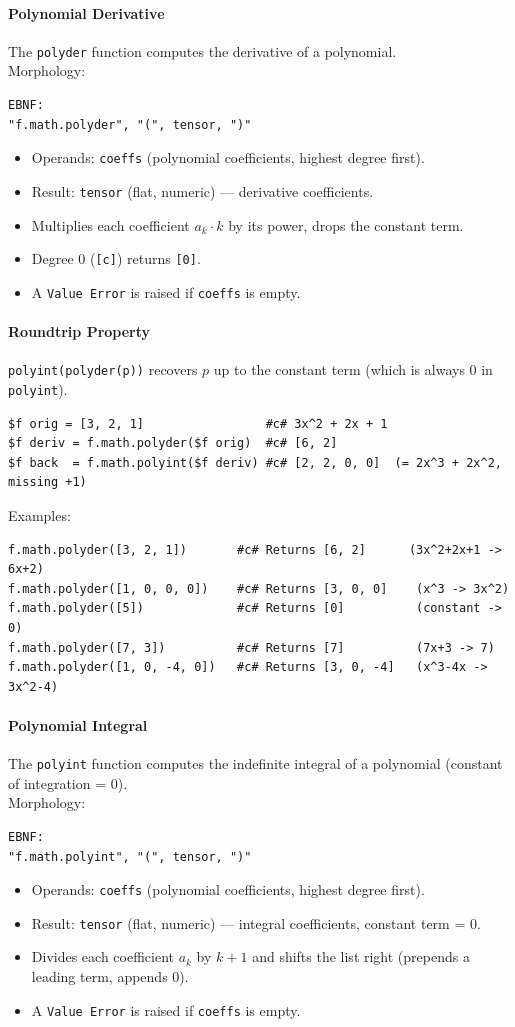 \paragraph{Polynomial Derivative}
The \texttt{polyder} function computes the derivative of a polynomial. \\ Morphology:
\begin{verbatim}
EBNF:
"f.math.polyder", "(", tensor, ")"
\end{verbatim}
\begin{itemize}
\item Operands: \texttt{coeffs} (polynomial coefficients, highest degree first).
\item Result: \texttt{tensor} (flat, numeric) --- derivative coefficients.
\item Multiplies each coefficient $a_k \cdot k$ by its power, drops the constant term.
\item Degree 0 (\texttt{[c]}) returns \texttt{[0]}.
\item A \texttt{Value Error} is raised if \texttt{coeffs} is empty.
\end{itemize}
\paragraph{Roundtrip Property} \texttt{polyint(polyder(p))} recovers $p$ up to the constant term (which is always 0 in \texttt{polyint}).
\begin{verbatim}
$f orig = [3, 2, 1]                 #c# 3x^2 + 2x + 1
$f deriv = f.math.polyder($f orig)  #c# [6, 2]
$f back  = f.math.polyint($f deriv) #c# [2, 2, 0, 0]  (= 2x^3 + 2x^2, missing +1)
\end{verbatim}
Examples:
\begin{verbatim}
f.math.polyder([3, 2, 1])       #c# Returns [6, 2]      (3x^2+2x+1 -> 6x+2)
f.math.polyder([1, 0, 0, 0])    #c# Returns [3, 0, 0]    (x^3 -> 3x^2)
f.math.polyder([5])             #c# Returns [0]          (constant -> 0)
f.math.polyder([7, 3])          #c# Returns [7]          (7x+3 -> 7)
f.math.polyder([1, 0, -4, 0])   #c# Returns [3, 0, -4]   (x^3-4x -> 3x^2-4)
\end{verbatim}

\paragraph{Polynomial Integral}
The \texttt{polyint} function computes the indefinite integral of a polynomial (constant of integration = 0). \\ Morphology:
\begin{verbatim}
EBNF:
"f.math.polyint", "(", tensor, ")"
\end{verbatim}
\begin{itemize}
\item Operands: \texttt{coeffs} (polynomial coefficients, highest degree first).
\item Result: \texttt{tensor} (flat, numeric) --- integral coefficients, constant term = 0.
\item Divides each coefficient $a_k$ by $k + 1$ and shifts the list right (prepends a leading term, appends 0).
\item A \texttt{Value Error} is raised if \texttt{coeffs} is empty.
\end{itemize}
